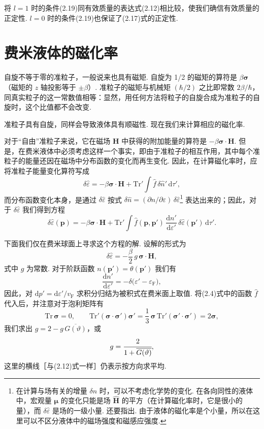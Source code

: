将 $l=1$ 时的条件(2.19)同有效质量的表达式(2.12)相比较，使我们确信有效质量的正定性. $l=0$ 时的条件(2.19)也保证了(2.17)式的正定性.

\section{费米液体的磁化率}

自旋不等于零的准粒子，一般说来也具有磁矩. 自旋为 1/2 的磁矩的算符是 $\beta\bm\sigma$（磁矩的 $z$ 轴投影等于 $\pm\beta$）. 准粒子的磁矩与机械矩 $(\hbar/2)$ 之比即常数 $2\beta/\hbar$，同真实粒子的这一常数值相等：显然，用任何方法将粒子的自旋合成为准粒子的自旋时，这个比值都不会改变.

准粒子具有自旋，同样会导致液体具有顺磁性. 现在我们来计算相应的磁化率.

对于“自由”准粒子来说，它在磁场 $\bm H$ 中获得的附加能量的算符是 $-\beta\bm\sigma\cdot\bm H$. 但是，在费米液体中必须考虑这样一个事实，即由于准粒子的相互作用，其中每个准粒子的能量还因在磁场中分布函数的变化而再生变化. 因此，在计算磁化率时，应将准粒子能量变化算符写成
\begin{equation}
\delta\hat\varepsilon=-\beta\bm\sigma\cdot\bm H+\mathrm{Tr}'\int\hat f\,\delta\hat n'\,\mathrm{d}\tau',
\end{equation}
而分布函数变化本身，是通过 $\delta\hat\varepsilon$ 按式 $\delta\hat n=(\partial n/\partial\varepsilon)\,\delta\hat\varepsilon$\footnote{在计算与场有关的增量 $\delta n$ 时，可以不考虑化学势的变化. 在各向同性的液体中，宏观量 $\bm\mu$ 的变化只能是场 $\hat{\bm H}$ 的平方（在计算磁化率时，它是很小的量），而 $\delta\hat\varepsilon$ 是场的一级小量. 还要指出. 由于液体的磁化率是个小量，所以在这里可以不区分液体中的磁场强度和磁感应强度.} 表达出来的；因此，对于 $\delta\hat\varepsilon$ 我们得到方程
\begin{equation}
\delta\hat\varepsilon(\bm p)=-\beta\bm\sigma\cdot\bm H+\mathrm{Tr}'\int\hat f(\bm p,\bm p')\,\frac{\mathrm{d}n'}{\mathrm{d}\varepsilon'}\,\delta\hat\varepsilon(\bm p')\,\mathrm{d}\tau'.
\end{equation}

下面我们仅在费米球面上寻求这个方程的解. 设解的形式为
\begin{equation}
\delta\hat\varepsilon=-\frac{\beta}{2}\,g\,\bm\sigma\cdot\bm H,
\end{equation}
式中 $g$ 为常数. 对于阶跃函数 $n(\bm p')=\theta(\bm p')$ 我们有
\begin{equation*}
\frac{\mathrm{d}n'}{\mathrm{d}\varepsilon'}=-\delta\bigl(\varepsilon'-\varepsilon_{\mathrm F}\bigr),
\end{equation*}
因此，对 $\mathrm{d}p'=\mathrm{d}\varepsilon'/v_{\mathrm F}$ 求积分归结为被积式在费米面上取值. 将(2.4)式中的函数 $\hat f$ 代入后，并注意对于泡利矩阵有
\begin{equation*}
\mathrm{Tr}\,\bm\sigma=0,\qquad
\mathrm{Tr}'(\bm\sigma\cdot\bm\sigma')\bm\sigma'=\frac{1}{3}\,\bm\sigma\,\mathrm{Tr}'(\bm\sigma'\cdot\bm\sigma')=2\bm\sigma,
\end{equation*}
我们求出 $g=2-g\,\overline{G(\vartheta)}$，或
\begin{equation}
g=\cfrac{2}{1+\overline{G(\vartheta)}},
\end{equation}
这里的横线［与(2.12)式一样］仍表示按方向求平均.

